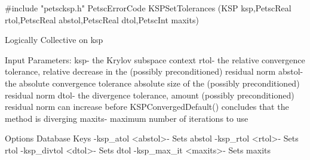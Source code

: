 #include "petscksp.h"
PetscErrorCode  KSPSetTolerances
   (KSP ksp,PetscReal rtol,PetscReal abstol,PetscReal dtol,PetscInt maxits)

Logically Collective on ksp

Input Parameters:
ksp- the Krylov subspace context
rtol- the relative convergence tolerance, relative decrease in the
(possibly preconditioned) residual norm
abstol- the absolute convergence tolerance absolute size of the
(possibly preconditioned) residual norm
dtol- the divergence tolerance, amount (possibly preconditioned)
residual norm can increase before KSPConvergedDefault() concludes that
the method is diverging
maxits- maximum number of iterations to use

Options Database Keys
-ksp_atol <abstol>- Sets abstol
-ksp_rtol <rtol>- Sets rtol
-ksp_divtol <dtol>- Sets dtol
-ksp_max_it <maxits>- Sets maxits
